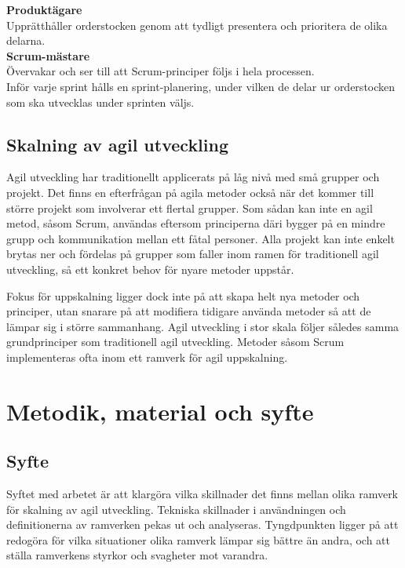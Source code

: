 		\textbf{Produktägare} \\
		Upprätthåller orderstocken genom att tydligt presentera och prioritera de olika delarna. \\
		
		\textbf{Scrum-mästare} \\
		Övervakar och ser till att Scrum-principer följs i hela processen. \\
		
		Inför varje sprint hålls en sprint-planering, under vilken de delar ur orderstocken som ska utvecklas under sprinten väljs.
			
		\cite{scrum_guide}
		

	\subsection{Skalning av agil utveckling}
		
		Agil utveckling har traditionellt applicerats på låg nivå med små grupper och projekt. Det finns en efterfrågan på agila metoder också när det kommer till större projekt som involverar ett flertal grupper. Som sådan kan inte en agil metod, såsom Scrum, användas eftersom principerna däri bygger på en mindre grupp och kommunikation mellan ett fåtal personer.
		Alla projekt kan inte enkelt brytas ner och fördelas på grupper som faller inom ramen för traditionell agil utveckling, så ett konkret behov för nyare metoder uppstår.
		
		Fokus för uppskalning ligger dock inte på att skapa helt nya metoder och principer, utan snarare på att modifiera tidigare använda metoder så att de lämpar sig i större sammanhang. Agil utveckling i stor skala följer således samma grundprinciper som traditionell agil utveckling. Metoder såsom Scrum implementeras ofta inom ett ramverk för agil uppskalning.

		
	\newpage

\section{Metodik, material och syfte}
	
	
	\subsection{Syfte}
	
		Syftet med arbetet är att klargöra vilka skillnader det finns mellan olika ramverk för skalning av agil utveckling. Tekniska skillnader i användningen och definitionerna av ramverken pekas ut och analyseras.
		Tyngdpunkten ligger på att redogöra för vilka situationer olika ramverk lämpar sig bättre än andra, och att ställa ramverkens styrkor och svagheter mot varandra. \newline
		
